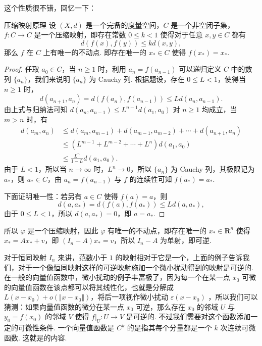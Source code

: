 这个性质很不错，回忆一下：

\begin{theorem}{压缩映射原理}{}
    设 $(X,d)$ 是一个完备的度量空间，$C$ 是一个非空闭子集，$f\colon C\to C$ 是一个压缩映射，即存在常数 $0\leqslant k < 1$ 使得对于任意 $x, y\in C$ 都有 \[d(f(x), f(y))\leqslant kd(x, y),\]那么 $f$ 在 $C$ 上有唯一的不动点. 即存在唯一的 $x_*\in C$ 使得 $f(x_*) = x_*$.
\end{theorem}

\begin{proof}
    任取 $a_0 \in C$，当 $n\geqslant 1$ 时，利用 $a_n = f(a_{n-1})$ 可以递归定义 $C$ 中的数列 $\{a_n\}$，我们来说明 $\{a_n\}$ 为 Cauchy 列. 根据题设，存在 $0\leqslant L <1$，使得当 $n\geqslant 1$ 时，\[d(a_{n+1}, a_n) = d(f(a_n), f(a_{n-1}))\leqslant Ld(a_n, a_{n-1}).\]
    由上式与归纳法可知 $d(a_n,a_{n-1})\leqslant L^{n-1}d(a_1, a_0)$ 对 $n\geqslant 1$ 均成立，当 $m > n$ 时，有
    \[\begin{aligned}
            d(a_m, a_n) & \leqslant d(a_m, a_{m-1}) + d(a_{m-1}, a_{m-2}) + \cdots + d(a_{n+1}, a_n) \\
                        & \leqslant (L^{m-1} + L^{m-2} + \cdots + L^{n})d(a_1, a_0)                  \\
                        & \leqslant \frac{L^n}{1-L}d(a_1, a_0).
        \end{aligned}\]
    由于 $L < 1$，所以当 $n\to\infty$ 时，$L^n\to 0$，所以 $\{a_n\}$ 为 Cauchy 列，其极限记为 $a_*$，则 $a_*\in C$，由 $a_n = f(a_{n-1})$ 与 $f$ 的连续性可知 $f(a_*) = a_*$.

    下面证明唯一性：若另有 $a\in C$ 使得 $f(a) = a$，则\[d(a, a_*) = d(f(a), f(a_*))\leqslant Ld(a, a_*),\]由于 $0\leqslant L < 1$，所以 $d(a, a_*) = 0$，即 $a = a_*$.
\end{proof}

所以 $\varphi$ 是一个压缩映射，因此 $\varphi$ 有唯一的不动点，即存在唯一的 $x_*\in \mathbf{R}^n$ 使得 $x_* = Ax_* + v$，即 $(I_n - A)x_* = v$，所以 $I_n - A$ 为单射，即可逆.

对于恒同映射 $I_n$ 来讲，范数小于 $1$ 的映射相对于它是一个，上面的例子告诉我们，对于一个像恒同映射这样的可逆映射施加一个微小扰动得到的映射是可逆的. 在一般的向量值函数中，微小扰动的例子丰富极了，因为每一个在某一点 $x_0$ 可微的向量值函数在该点都可以将其线性化，也就是分解成 $L(x - x_0) + o(\Vert x - x_0\Vert)$，将后一项视作微小扰动 $\varepsilon(x - x_0)$ ，所以我们可以猜测：如果向量值函数的微分在某一点 $x_0$ 可逆，那么存在 $x_0$ 的邻域 $U$ 与 $y_0 = f(x_0)$ 的邻域 $V$ 使得 $\left.f\right|_U \colon U\to V$ 是可逆的. 不过我们需要对这个函数添加一定的可微性条件. 一个向量值函数是 $C^k$ 的是指其每个分量都是一个 $k$ 次连续可微函数. 这就是的内容.

